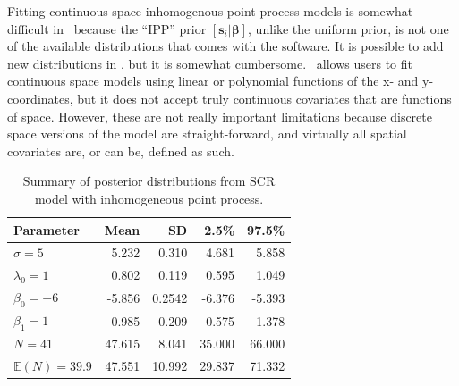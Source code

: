 Fitting continuous space inhomogenous point process models is somewhat
difficult in \bugs~because the ``IPP'' prior $[\mathbf{s}_i | \bm
\beta]$, unlike the uniform prior, is not one of the
available distributions that comes with the software. It is
possible to add new distributions in \bugs, but it is somewhat
cumbersome.  \secr~allows
users to fit continuous space models using linear or polynomial functions of the x- and y-
coordinates, but it does not accept truly continuous covariates that
are functions of space. However, these
are not really important limitations because discrete
space versions of the model are straight-forward, and virtually all spatial
covariates are, or can be, defined as such.


\begin{table}[h!]
\centering
\caption{Summary of posterior distributions from SCR model with
  inhomogeneous point process. }
\begin{tabular}{lrrrr}
\hline
Parameter 	 	& Mean  	& SD    	& 2.5\% 	& 97.5\% \\
\hline
 $\sigma=5$ 	 	&  5.232 	&  0.310 	&  4.681 	&  5.858 \\
 $\lambda_0=1$ 	 	&  0.802 	&  0.119 	&  0.595 	&  1.049 \\
 $\beta_0=-6$ 	 	& -5.856        & 0.2542        & -6.376        & -5.393 \\
 $\beta_1=1$ 	 	&  0.985 	&  0.209 	&  0.575 	&  1.378 \\
 $N=41$ 	 	& 47.615 	&  8.041 	& 35.000 	& 66.000 \\
 $\mathbb{E}(N)=39.9$ 	& 47.551 	& 10.992 	& 29.837 	& 71.332 \\
\hline
\end{tabular}
\label{state-space.tab.simIPP}
\end{table}


